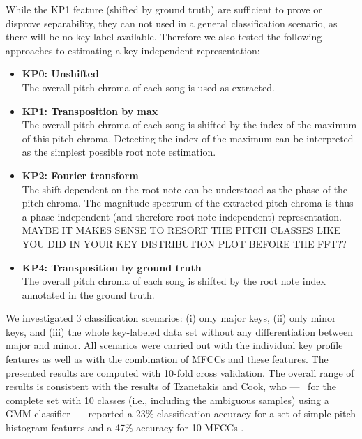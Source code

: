 \documentclass{article}
\begin{document}
While the KP1 feature (shifted by ground truth) are sufficient to prove or disprove separability, they can not used in a general classification scenario, as there will be no key label available. Therefore we also tested the following approaches to estimating a key-independent representation:
\begin{itemize}
    \item   \textbf{KP0: Unshifted}\\
        The overall pitch chroma of each song is used as extracted.
    \item   \textbf{KP1: Transposition by max}\\
        The overall pitch chroma of each song is shifted by the index of the maximum of this pitch chroma. Detecting the index of the maximum can be interpreted as the simplest possible root note estimation.
    \item   \textbf{KP2: Fourier transform}\\
        The shift dependent on the root note can be understood as the phase of the pitch chroma. The magnitude spectrum of the extracted pitch chroma is thus a phase-independent (and therefore root-note independent) representation. MAYBE IT MAKES SENSE TO RESORT THE PITCH CLASSES LIKE YOU DID IN YOUR KEY DISTRIBUTION PLOT BEFORE THE FFT?? %
    \item   \textbf{KP4: Transposition by ground truth}\\
        The overall pitch chroma of each song is shifted by the root note index annotated in the ground truth.
\end{itemize}

We investigated 3 classification scenarios: (i) only major keys, (ii) only minor keys, and (iii) the whole key-labeled data set without any differentiation between major and minor. All scenarios were carried out with the individual key profile features as well as with the combination of MFCCs and these features. The presented results are computed with 10-fold cross validation.
The overall range of results is consistent with the results of Tzanetakis and Cook, who ---~ for the complete set with 10 classes (i.e., including the ambiguous samples) using a GMM classifier~--- reported a 23\% classification accuracy for a set of simple pitch histogram features and a 47\% accuracy for 10 MFCCs \cite{tzanetakis_musical_2002}. 
\end{document}
